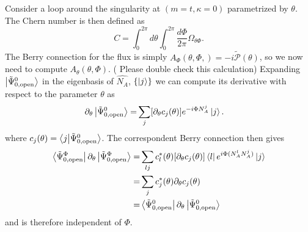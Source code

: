 \documentclass[twocolumn,amsmath,longbibliography,amssymb,superscriptaddress]{revtex4-1}
\newcommand{\carlos}[1]{{\color{red} #1}}
\begin{document}
Consider a loop around the singularity at $(m=t,\kappa=0)$ parametrized by $\theta$. The Chern number is then defined as
\begin{equation}
C = \int_0^{2\pi}d\theta\int_0^{2\pi}\frac{d\Phi}{2\pi} \Omega_{\theta\Phi}.
\label{eq:chern}
\end{equation} 
The Berry connection for the flux is simply $A_\Phi(\theta,\Phi,) = -i\tilde{\mathcal{P}}(\theta)$, so we now need to compute $A_\theta(\theta,\Phi)$. (\carlos{Please double check this calculation}) Expanding $\ket{\tilde{\Psi}_{0,{\rm open}}^0}$ in the eigenbasis of $\hat{N_A}$, $\{\ket{j}\}$ we can compute its derivative with respect to the parameter $\theta$ as
\begin{align*}
\partial_\theta \ket{\tilde{\Psi}_{0,{\rm open}}^0} =& \sum_j [\partial_\theta c_j (\theta)]e^{-i\Phi N_A^j}\ket{j}.
\end{align*}
where $c_j(\theta) = \bra{j}\ket{\tilde{\Psi}_{0,{\rm open}}^0}$. The correspondent Berry connection then gives
\begin{align*}
\bra{\tilde{\Psi}_{0,{\rm open}}^\Phi}\partial_\theta \ket{\tilde{\Psi}_{0,{\rm open}}^\Phi} =& \sum_{lj} c^*_l(\theta) [\partial_\theta c_j(\theta)] \bra{l} e^{i\Phi (N_A^lN_A^j)}\ket{j}\\
=& \sum_j  c^*_j(\theta) \partial_\theta c_j(\theta) \\
=&\bra{\tilde{\Psi}_{0,{\rm open}}^0}\partial_\theta \ket{\tilde{\Psi}_{0,{\rm open}}^0}
\end{align*}
and is therefore independent of $\Phi$. 
\end{document}
